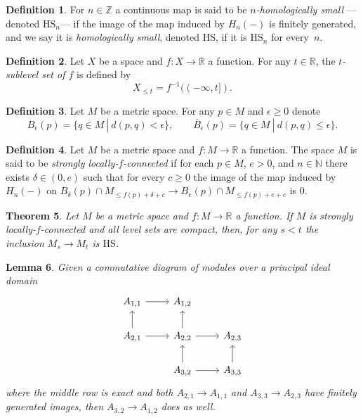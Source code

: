 \documentclass{amsart}
\newtheorem{theorem}{Theorem}
\newtheorem{lemma}[theorem]{Lemma}
\theoremstyle{definition}
\newtheorem{definition}[theorem]{Definition}
\newcommand{\N}{\mathbb{N}}
\newcommand{\Z}{\mathbb{Z}}
\newcommand{\R}{\mathbb{R}}
\newcommand{\HS}{\mathrm{HS}}
\begin{document}
\begin{definition}
	For $n \in \Z$ a continuous map is said to be \textit{$n$-homologically small} ---denoted $\HS_n$--- if the image of the map induced by $H_n(-)$ is finitely generated, and we say it is \textit{homologically small}, denoted $\HS$, if it is $\HS_n$ for every~$n$.
\end{definition}

\begin{definition}
	Let $X$ be a space and $f \colon X \to \R$ a function. For any $t \in \R$, the \textit{$t$-sublevel set of $f$} is defined by 
	\begin{equation*}
	X_{\leq t} = f^{-1}((-\infty, t]).
	\end{equation*}
\end{definition}

\begin{definition}
	Let $M$ be a metric space. For any $p \in M$ and $\epsilon \geq 0$ denote
	\begin{equation*}
	B_\epsilon(p) = \{q \in M\ |\ d(p,q) < \epsilon\}, \qquad
	\overline B_\epsilon(p) = \{q \in M\ |\ d(p,q) \leq \epsilon\}.
	\end{equation*}
\end{definition}

\begin{definition}
	Let $M$ be a metric space and $f \colon M \to \R$ a function.
	The space $M$ is said to be \textit{strongly locally-$f$-connected} if for each $p \in M$, $e > 0$, and $n \in \N$ there exists $\delta \in (0, e)$ such that for every $c \geq 0$ the image of the map induced by $H_n(-)$ on $B_\delta(p) \cap M_{\leq f(p)+\delta+c} \to B_e(p) \cap M_{\leq f(p)+e+c}$ is $0$.
\end{definition}

\begin{theorem} \label{t:strong local connectenss implies q-tameness}
	Let $M$ be a metric space and $f \colon M \to \R$ a function. If $M$ is strongly locally-$f$-connected and all level sets are compact, then, for any $s < t$ the inclusion $M_s \to M_t$ is $\HS$.
\end{theorem}

\begin{lemma} \label{l:commutative algebra}
	Given a commutative diagram of modules over a principal ideal domain
	\begin{equation*}
	\begin{tikzcd}
	A_{1,1} \arrow[r] & A_{1,2} & \\
	A_{2,1} \arrow[r] \arrow[u] & A_{2,2} \arrow[r] \arrow[u] & A_{2,3} \\
	& A_{3,2} \arrow[r] \arrow[u] & A_{3,3} \arrow[u]
	\end{tikzcd}
	\end{equation*}
	where the middle row is exact and both $A_{2,1} \to A_{1,1}$ and $A_{3,3} \to A_{2,3}$ have finitely generated images, then $A_{3,2} \to A_{1,2}$ does as well.
\end{lemma}
\end{document}
